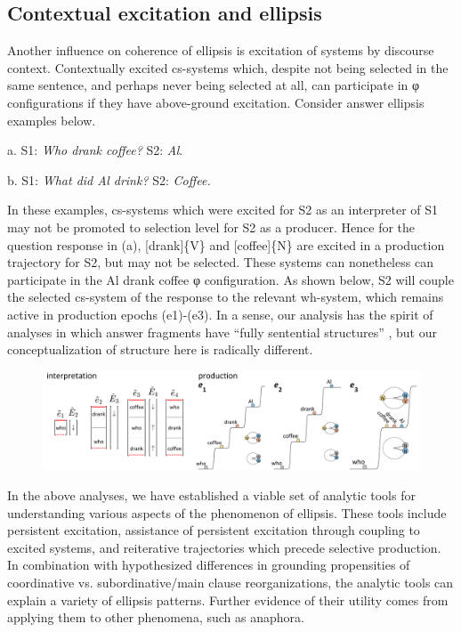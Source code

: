 \subsection{Contextual excitation and ellipsis}

Another influence on coherence of ellipsis is excitation of systems by discourse context. Contextually excited cs-systems which, despite not being selected in the same sentence, and perhaps never being selected at all, can participate in φ configurations if they have above-ground excitation. Consider answer ellipsis examples below.

    a.    S1: \textit{Who drank coffee?}  S2: \textit{Al}.

     b.    S1: \textit{What did Al drink?}   S2: \textit{Coffee.}

  In these examples, cs-systems which were excited for S2 as an interpreter of S1 may not be promoted to selection level for S2 as a producer. Hence for the question response in (a), [drank]\{V\} and [coffee]\{N\} are excited in a production trajectory for S2, but may not be selected. These systems can nonetheless can participate in the {\textbar}Al drank coffee{\textbar} φ configuration. As shown below, S2 will couple the selected cs-system of the response to the relevant wh-system, which remains active in production epochs (e1)-(e3). In a sense, our analysis has the spirit of analyses in which answer fragments have “fully sentential structures”  \citep{Merchant2005}, but our conceptualization of structure here is radically different.

  
\begin{figure}
\includegraphics[width=\textwidth]{figures/Tilsen-img151.png}
\caption{\missingcaption}
\label{fig:}
\end{figure}
 

  In the above analyses, we have established a viable set of analytic tools for understanding various aspects of the phenomenon of ellipsis. These tools include persistent excitation, assistance of persistent excitation through coupling to excited systems, and reiterative trajectories which precede selective production. In combination with hypothesized differences in grounding propensities of coordinative vs. subordinative/main clause reorganizations, the analytic tools can explain a variety of ellipsis patterns. Further evidence of their utility comes from applying them to other phenomena, such as anaphora.

